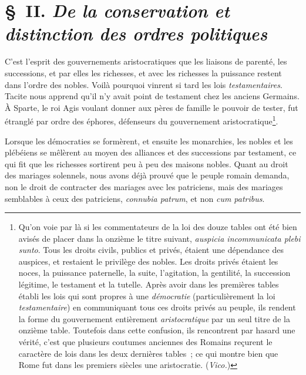 \documentclass[french,twoside]{book} %
\begin{document}
\section[{§ II. De la conservation et distinction des ordres politiques}]{§ II. {\itshape De la conservation et distinction des ordres politiques}}
\noindent C’est l’esprit des gouvernements aristocratiques que les liaisons de parenté, les successions, et par  elles les richesses, et avec les richesses la puissance restent dans l’ordre des nobles. Voilà pourquoi vinrent si tard les lois {\itshape testamentaires}. Tacite nous apprend qu’il n’y avait point de testament chez les anciens Germains. À Sparte, le roi Agis voulant donner aux pères de famille le pouvoir de tester, fut étranglé par ordre des éphores, défenseurs du gouvernement aristocratique\footnote{Qu’on voie par là si les commentateurs de la loi des douze tables ont été bien avisés de placer dans la onzième le titre suivant, \emph{{\itshape auspicia incommunicata plebi sunto}}. Tous les droits civils, publics et privés, étaient une dépendance des auspices, et restaient le privilège des nobles. Les droits privés étaient les noces, la puissance paternelle, la suite, l’agitation, la gentilité, la succession légitime, le testament et la tutelle. Après avoir dans les premières tables établi les lois qui sont propres à une {\itshape démocratie} (particulièrement la loi {\itshape testamentaire}) en communiquant tous ces droits privés au peuple, ils rendent la forme du gouvernement entièrement {\itshape aristocratique} par un seul titre de la onzième table. Toutefois dans cette confusion, ils rencontrent par hasard une vérité, c’est que plusieurs coutumes anciennes des Romains reçurent le caractère de lois dans les deux dernières tables ; ce qui montre bien que Rome fut dans les premiers siècles une aristocratie. ({\itshape Vico.})}.\par
Lorsque les démocraties se formèrent, et ensuite les monarchies, les nobles et les plébéiens se mêlèrent au moyen des alliances et des successions par testament, ce qui fit que les richesses sortirent peu à peu des maisons nobles. Quant au droit des mariages solennels, nous avons déjà prouvé que le peuple romain demanda, non le droit de contracter des mariages avec les patriciens, mais des mariages semblables à ceux des patriciens, {\itshape connubia patrum}, et non {\itshape cum patribus}.\par
\end{document}
